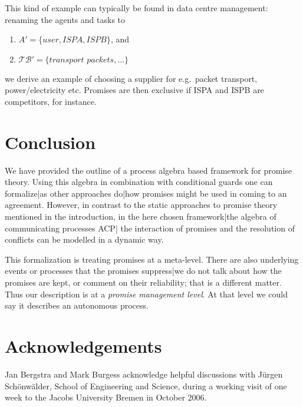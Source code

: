 \documentclass{pseudoelsart}
\begin{document}
This kind of example can typically be found in data centre management:
renaming the agents and tasks to 
\begin{enumerate}
\item $A'=\{user, ISPA, ISPB\}$, and
\item $\mathcal{TB}'=\{\textit{transport packets},  \ldots \}$
\end{enumerate}
we derive an example of choosing a supplier for e.g.\ packet transport,
power/elec\-tri\-ci\-ty etc. Promises are then exclusive if ISPA and ISPB are
competitors, for instance.

\section{Conclusion}
We have provided the outline of a process algebra based framework for promise theory.
Using this algebra in combination with conditional guards one can formalize|as other approaches do|how promises might be used
in coming to an agreement. However, in contrast to the static approaches to promise theory mentioned in the introduction,
in the here chosen framework|the algebra of communicating processes ACP| the interaction of promises and the resolution of conflicts can be modelled in a dynamic way.

This formalization is treating promises at a meta-level. There are also
underlying events or processes that the promises suppress|we do not talk about
how the promises are kept, or comment on their reliability; that is a different
matter. Thus our description is at a \emph{promise management level}. At that
level we could say it describes an autonomous process.
\section*{Acknowledgements}
Jan Bergstra and Mark Burgess acknowledge helpful discussions with J\"urgen
Sch\"onw\"alder, School of Engineering and Science, during a working visit  of one week to the Jacobs University
Bremen in October 2006.
\end{document}
